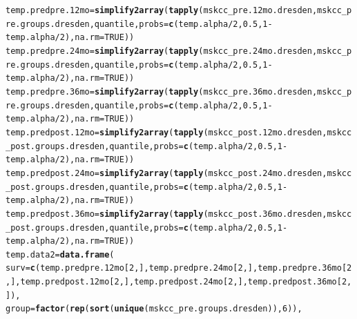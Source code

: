 \documentclass{article}\usepackage[]{graphicx}\usepackage[]{color}
\makeatletter
\newcommand{\hlnum}[1]{\textcolor[rgb]{0.686,0.059,0.569}{#1}}%
\newcommand{\hlopt}[1]{\textcolor[rgb]{0,0,0}{#1}}%
\newcommand{\hlstd}[1]{\textcolor[rgb]{0.345,0.345,0.345}{#1}}%
\newcommand{\hlkwb}[1]{\textcolor[rgb]{0.69,0.353,0.396}{#1}}%
\newcommand{\hlkwc}[1]{\textcolor[rgb]{0.333,0.667,0.333}{#1}}%
\newcommand{\hlkwd}[1]{\textcolor[rgb]{0.737,0.353,0.396}{\textbf{#1}}}%
\newenvironment{kframe}{%
 \def\at@end@of@kframe{}%
 \ifinner\ifhmode%
  \def\at@end@of@kframe{\end{minipage}}%
  \begin{minipage}{\columnwidth}%
 \fi\fi%
 \def\FrameCommand##1{\hskip\@totalleftmargin \hskip-\fboxsep
 \colorbox{shadecolor}{##1}\hskip-\fboxsep
     \hskip-\linewidth \hskip-\@totalleftmargin \hskip\columnwidth}%
 \MakeFramed {\advance\hsize-\width
   \@totalleftmargin\z@ \linewidth\hsize
   \@setminipage}}%
 {\par\unskip\endMakeFramed%
 \at@end@of@kframe}
\newenvironment{knitrout}{}{} %
\makeatother
\begin{document}
\begin{knitrout}
\begin{kframe}
\begin{alltt}
\hlstd{temp.predpre.12mo} \hlkwb{=} \hlkwd{simplify2array}\hlstd{(}\hlkwd{tapply}\hlstd{(mskcc_pre.12mo.dresden, mskcc_pre.groups.dresden, quantile,} \hlkwc{probs} \hlstd{=} \hlkwd{c}\hlstd{(temp.alpha}\hlopt{/}\hlnum{2}\hlstd{,} \hlnum{0.5}\hlstd{,} \hlnum{1}\hlopt{-}\hlstd{temp.alpha}\hlopt{/}\hlnum{2}\hlstd{),} \hlkwc{na.rm} \hlstd{=} \hlnum{TRUE}\hlstd{))}
\hlstd{temp.predpre.24mo} \hlkwb{=} \hlkwd{simplify2array}\hlstd{(}\hlkwd{tapply}\hlstd{(mskcc_pre.24mo.dresden, mskcc_pre.groups.dresden, quantile,} \hlkwc{probs} \hlstd{=} \hlkwd{c}\hlstd{(temp.alpha}\hlopt{/}\hlnum{2}\hlstd{,} \hlnum{0.5}\hlstd{,} \hlnum{1}\hlopt{-}\hlstd{temp.alpha}\hlopt{/}\hlnum{2}\hlstd{),} \hlkwc{na.rm} \hlstd{=} \hlnum{TRUE}\hlstd{))}
\hlstd{temp.predpre.36mo} \hlkwb{=} \hlkwd{simplify2array}\hlstd{(}\hlkwd{tapply}\hlstd{(mskcc_pre.36mo.dresden, mskcc_pre.groups.dresden, quantile,} \hlkwc{probs} \hlstd{=} \hlkwd{c}\hlstd{(temp.alpha}\hlopt{/}\hlnum{2}\hlstd{,} \hlnum{0.5}\hlstd{,} \hlnum{1}\hlopt{-}\hlstd{temp.alpha}\hlopt{/}\hlnum{2}\hlstd{),} \hlkwc{na.rm} \hlstd{=} \hlnum{TRUE}\hlstd{))}
\hlstd{temp.predpost.12mo} \hlkwb{=} \hlkwd{simplify2array}\hlstd{(}\hlkwd{tapply}\hlstd{(mskcc_post.12mo.dresden, mskcc_post.groups.dresden, quantile,} \hlkwc{probs} \hlstd{=} \hlkwd{c}\hlstd{(temp.alpha}\hlopt{/}\hlnum{2}\hlstd{,} \hlnum{0.5}\hlstd{,} \hlnum{1}\hlopt{-}\hlstd{temp.alpha}\hlopt{/}\hlnum{2}\hlstd{),} \hlkwc{na.rm} \hlstd{=} \hlnum{TRUE}\hlstd{))}
\hlstd{temp.predpost.24mo} \hlkwb{=} \hlkwd{simplify2array}\hlstd{(}\hlkwd{tapply}\hlstd{(mskcc_post.24mo.dresden, mskcc_post.groups.dresden, quantile,} \hlkwc{probs} \hlstd{=} \hlkwd{c}\hlstd{(temp.alpha}\hlopt{/}\hlnum{2}\hlstd{,} \hlnum{0.5}\hlstd{,} \hlnum{1}\hlopt{-}\hlstd{temp.alpha}\hlopt{/}\hlnum{2}\hlstd{),} \hlkwc{na.rm} \hlstd{=} \hlnum{TRUE}\hlstd{))}
\hlstd{temp.predpost.36mo} \hlkwb{=} \hlkwd{simplify2array}\hlstd{(}\hlkwd{tapply}\hlstd{(mskcc_post.36mo.dresden, mskcc_post.groups.dresden, quantile,} \hlkwc{probs} \hlstd{=} \hlkwd{c}\hlstd{(temp.alpha}\hlopt{/}\hlnum{2}\hlstd{,} \hlnum{0.5}\hlstd{,} \hlnum{1}\hlopt{-}\hlstd{temp.alpha}\hlopt{/}\hlnum{2}\hlstd{),} \hlkwc{na.rm} \hlstd{=} \hlnum{TRUE}\hlstd{))}
\hlstd{temp.data2} \hlkwb{=} \hlkwd{data.frame}\hlstd{(}
        \hlkwc{surv} \hlstd{=} \hlkwd{c}\hlstd{(temp.predpre.12mo[}\hlnum{2}\hlstd{,], temp.predpre.24mo[}\hlnum{2}\hlstd{,], temp.predpre.36mo[}\hlnum{2}\hlstd{,], temp.predpost.12mo[}\hlnum{2}\hlstd{,], temp.predpost.24mo[}\hlnum{2}\hlstd{,], temp.predpost.36mo[}\hlnum{2}\hlstd{,]),}
        \hlkwc{group} \hlstd{=} \hlkwd{factor}\hlstd{(}\hlkwd{rep}\hlstd{(}\hlkwd{sort}\hlstd{(}\hlkwd{unique}\hlstd{(mskcc_pre.groups.dresden)),} \hlnum{6}\hlstd{)),}

\end{alltt}
\end{kframe}
\end{knitrout}
\end{document}
